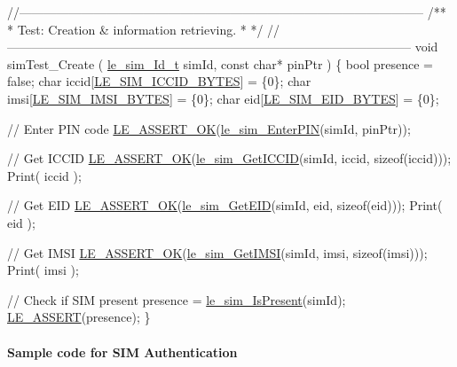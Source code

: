 \begin{DoxyCodeInclude}
\textcolor{comment}{//--------------------------------------------------------------------------------------------------}\textcolor{comment}{}
\textcolor{comment}{/**}
\textcolor{comment}{ * Test: Creation & information retrieving.}
\textcolor{comment}{ *}
\textcolor{comment}{ */}
\textcolor{comment}{//--------------------------------------------------------------------------------------------------}
\textcolor{keywordtype}{void} simTest\_Create
(
    \hyperlink{le__sim__interface_8h_aace49df88426119626fb1ef4e544ccdd}{le\_sim\_Id\_t} simId,
    \textcolor{keyword}{const} \textcolor{keywordtype}{char}* pinPtr
)
\{
    \textcolor{keywordtype}{bool}            presence = \textcolor{keyword}{false};
    \textcolor{keywordtype}{char}            iccid[\hyperlink{le__sim__interface_8h_a70c33c93f96c8376220b123909654d61}{LE\_SIM\_ICCID\_BYTES}] = \{0\};
    \textcolor{keywordtype}{char}            imsi[\hyperlink{le__sim__interface_8h_af25612258426b8b806ab4128e5b055b6}{LE\_SIM\_IMSI\_BYTES}] = \{0\};
    \textcolor{keywordtype}{char}            eid[\hyperlink{le__sim__interface_8h_a276b1619d8c45072da5572addb52e91f}{LE\_SIM\_EID\_BYTES}] = \{0\};

    \textcolor{comment}{// Enter PIN code}
    \hyperlink{le__log_8h_a7cd2daa3d4af1de4d29e0eed95187484}{LE\_ASSERT\_OK}(\hyperlink{le__sim__interface_8h_ac9cafacb5affb0b531534e3fc547ebd2}{le\_sim\_EnterPIN}(simId, pinPtr));

    \textcolor{comment}{// Get ICCID}
    \hyperlink{le__log_8h_a7cd2daa3d4af1de4d29e0eed95187484}{LE\_ASSERT\_OK}(\hyperlink{le__sim__interface_8h_a7b43e4e8713af665657e15ae0f5bc1e8}{le\_sim\_GetICCID}(simId, iccid, \textcolor{keyword}{sizeof}(iccid)));
    Print( iccid );

    \textcolor{comment}{// Get EID}
    \hyperlink{le__log_8h_a7cd2daa3d4af1de4d29e0eed95187484}{LE\_ASSERT\_OK}(\hyperlink{le__sim__interface_8h_a069ff8cf1d16a1b639c893619a618c10}{le\_sim\_GetEID}(simId, eid, \textcolor{keyword}{sizeof}(eid)));
    Print( eid );

    \textcolor{comment}{// Get IMSI}
    \hyperlink{le__log_8h_a7cd2daa3d4af1de4d29e0eed95187484}{LE\_ASSERT\_OK}(\hyperlink{le__sim__interface_8h_acc0f801f268630ea496377077a366374}{le\_sim\_GetIMSI}(simId, imsi, \textcolor{keyword}{sizeof}(imsi)));
    Print( imsi );

    \textcolor{comment}{// Check if SIM present}
    presence = \hyperlink{le__sim__interface_8h_aa3255a29cec4358c5e0d68b9ac62ff88}{le\_sim\_IsPresent}(simId);
    \hyperlink{le__log_8h_ac0dbbef91dc0fed449d0092ff0557b39}{LE\_ASSERT}(presence);
\}
\end{DoxyCodeInclude}
\hypertarget{c_simTestAuthentication}{}\paragraph{Sample code for S\+IM Authentication}\label{c_simTestAuthentication}


